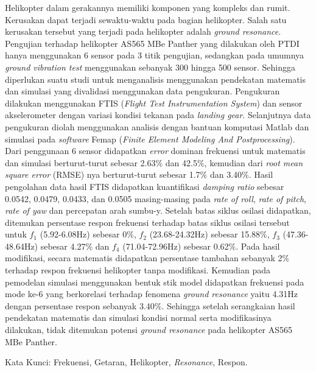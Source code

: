 Helikopter dalam gerakannya memiliki komponen yang kompleks dan rumit. Kerusakan dapat terjadi sewaktu-waktu pada bagian helikopter. Salah satu kerusakan tersebut yang terjadi pada helikopter adalah \textit{ground resonance}. Pengujian terhadap helikopter AS565 MBe Panther yang dilakukan oleh PTDI hanya menggunakan 6 sensor pada 3 titik pengujian, sedangkan pada umumnya \textit{ground vibration test} menggunakan sebanyak 300 hingga 500 sensor. Sehingga diperlukan suatu studi untuk menganalisis menggunakan pendekatan matematis dan simulasi yang divalidasi menggunakan data pengukuran. Pengukuran dilakukan menggunakan FTIS (\textit{Flight Test Instrumentation System}) dan sensor akselerometer dengan variasi kondisi tekanan pada \textit{landing gear}. Selanjutnya data pengukuran diolah menggunakan analisis dengan bantuan komputasi Matlab dan simulasi pada \textit{software} Femap (\textit{Finite Element Modeling And Postprocessing}). Dari penggunaan 6 sensor didapatkan \textit{error} dominan frekuensi untuk matematis dan simulasi berturut-turut sebesar 2.63$\%$ dan 42.5$\%$, kemudian dari \textit{root mean square error} (RMSE) nya berturut-turut sebesar 1.7$\%$ dan 3.40$\%$. Hasil pengolahan data hasil FTIS didapatkan kuantifikasi \textit{damping ratio} sebesar 0.0542, 0.0479, 0.0433, dan 0.0505 masing-masing pada \textit{rate of roll}, \textit{rate of pitch}, \textit{rate of yaw} dan percepatan arah sumbu-y. Setelah batas siklus osilasi didapatkan, ditemukan persentase respon frekuensi terhadap batas siklus osilasi tersebut untuk $f_1$ (5.92-6.08Hz) sebesar 0$\%$, $f_2$ (23.68-24.32Hz) sebesar 15.88$\%$, $f_3$ (47.36-48.64Hz) sebesar 4.27$\%$ dan $f_4$ (71.04-72.96Hz) sebesar 0.62$\%$. Pada hasil modifikasi, secara matematis didapatkan persentase tambahan sebanyak 2$\%$ terhadap respon frekuensi helikopter tanpa modifikasi. Kemudian pada pemodelan simulasi menggunakan bentuk stik model didapatkan frekuensi pada mode ke-6 yang berkorelasi terhadap fenomena \textit{ground resonance} yaitu 4.31Hz dengan persentase respon sebanyak 3.40$\%$. Sehingga setelah serangkaian hasil pendekatan matematis dan simulasi kondisi normal serta modifikasinya dilakukan, tidak ditemukan potensi \textit{ground resonance} pada helikopter AS565 MBe Panther.

Kata Kunci: Frekuensi, Getaran, Helikopter, \textit{Resonance}, Respon.
